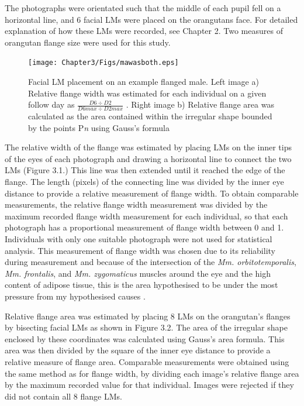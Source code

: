 The photographs were orientated such that the middle of each pupil fell on a horizontal line, and 6 facial LMs were placed on the orangutans face. For detailed explanation of how these LMs were recorded, see Chapter 2. Two measures of orangutan flange size were used for this study.  

\begin{figure}
    \centering
    \texttt{[image: Chapter3/Figs/mawasboth.eps]}
    \caption{Facial LM placement on an example flanged male. Left image a) Relative flange width was estimated for each individual on a given follow day as \(  \frac{D6 \div D2}{D6\textit{max} \div D2\textit{max}}\) . Right image b) Relative flange area was calculated as the area contained within the irregular shape bounded by the points P\textit{n} using Gauss's formula}
    \label{fig:orangutanfameasures}
\end{figure}

The relative width of the flange was estimated by placing LMs on the inner tips of the eyes of each photograph and drawing a horizontal line to connect the two LMs (Figure 3.1.) This line was then extended until it reached the edge of the flange. The length (pixels) of the connecting line was divided by the inner eye distance to provide a relative measurement of flange width. To obtain comparable measurements, the relative flange width measurement was divided by the maximum recorded flange width measurement for each individual, so that each photograph has a proportional measurement of flange width between 0 and 1. Individuals with only one suitable photograph were not used for statistical analysis. This measurement of flange width was chosen due to its reliability during measurement and because of the intersection of the \textit{Mm. orbitotemporalis}, \textit{Mm. frontalis}, and \textit{Mm. zygomaticus} muscles around the eye and the high content of adipose tissue, this is the area hypothesised to be under the most pressure from my hypothesised causes \citep{Winkler.1989}. 

Relative flange area was estimated by placing 8 LMs on the orangutan's flanges by bisecting facial LMs as shown in Figure 3.2.  The area of the irregular shape enclosed by these coordinates was calculated using Gauss's area formula. This area was then divided by the square of the inner eye distance to provide a relative measure of flange area. Comparable measurements were obtained using the same method as for flange width, by dividing each image's relative flange area by the maximum recorded value for that individual. Images were rejected if they did not contain all 8 flange LMs. 

